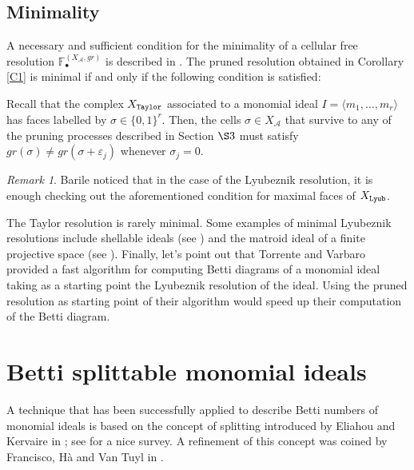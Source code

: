 \documentclass[12pt]{amsart}
\theoremstyle{definition}
\theoremstyle{remark}
\newtheorem{remark}[theorem]{Remark}
\numberwithin{equation}{section}
\newcommand{\cA}{{\mathcal A}}
\newcommand{\phil}[1]{{\color{red} \sf $\star\star$ Philippe: [#1]}}
\begin{document}
\subsection{Minimality}

A necessary and sufficient condition for the minimality of a cellular free resolution
$\mathbb{F}_{\bullet}^{(X_{\cA},gr)}$  is described in \cite[Lemma 7.5]{BW}.
The pruned resolution obtained in Corollary \ref{C1} is minimal
if and only if the following condition is satisfied:


\vskip 2mm

Recall that the  complex $X_{\tt Taylor}$ associated to  a monomial
ideal $I=\langle m_1,\dots, m_r \rangle$ has faces labelled by
$\sigma \in \{0,1\}^r$. Then, the cells $\sigma\in X_{\cA}$ that
survive to any of the pruning processes described in Section $\S 3$
must satisfy
 $gr(\sigma) \neq gr(\sigma + \varepsilon_j) $ whenever $\sigma_j=0$.

\vskip 2mm

\begin{remark}
Barile \cite{Bar} noticed that in the case of the Lyubeznik resolution, it is enough
checking out the aforementioned condition for maximal faces of $X_{\tt Lyub}$.
\end{remark}

\vskip 2mm

The Taylor resolution is rarely minimal.
Some examples of minimal Lyubeznik resolutions
include shellable ideals (see \cite{BW}) and the matroid ideal of a
finite projective space (see \cite{Nov}). Finally, let's point out that Torrente and Varbaro \cite{TV15} provided a
fast algorithm for computing Betti diagrams of a monomial ideal taking as a starting point
the Lyubeznik resolution of the ideal. Using the pruned resolution as starting
point of their algorithm would speed up their
computation of the Betti diagram.






\section{Betti splittable monomial ideals} \label{split}
A technique that has been successfully applied to describe Betti
numbers of monomial ideals is based on the concept of splitting
introduced by Eliahou and Kervaire in \cite{EK}; see \cite{HVT2} for a nice survey.
A refinement of this concept was coined by Francisco, H\`a and Van Tuyl
in \cite{FHV}.
\end{document}
